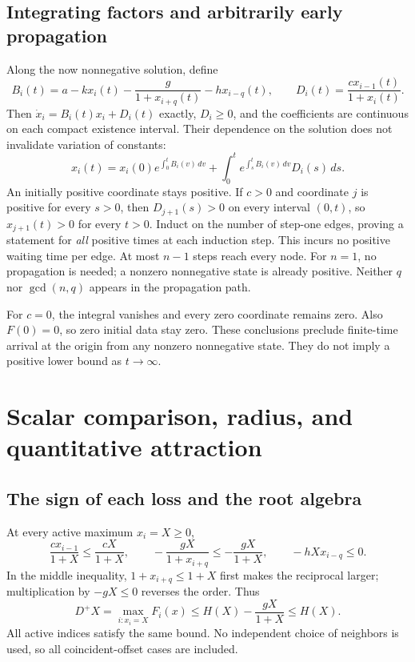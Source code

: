 \documentclass[11pt]{article}
\begin{document}
\subsection{Integrating factors and arbitrarily early propagation}
Along the now nonnegative solution, define
\[
 B_i(t)=a-kx_i(t)-\frac{g}{1+x_{i+q}(t)}-h x_{i-q}(t),\qquad
 D_i(t)=\frac{c x_{i-1}(t)}{1+x_i(t)}.
\]
Then $\dot x_i=B_i(t)x_i+D_i(t)$ exactly, $D_i\geq0$, and the coefficients
are continuous on each compact existence interval. Their dependence on
the solution does not invalidate variation of constants:
\begin{equation}\label{A01:positive}
 x_i(t)=x_i(0)e^{\int_0^t B_i(v)\,dv}
       +\int_0^t e^{\int_s^t B_i(v)\,dv}D_i(s)\,ds.
\end{equation}
An initially positive coordinate stays positive. If $c>0$ and coordinate
$j$ is positive for every $s>0$, then $D_{j+1}(s)>0$ on every interval
$(0,t)$, so $x_{j+1}(t)>0$ for every $t>0$. Induct on the number of
step-one edges, proving a statement for \emph{all} positive times at
each induction step. This incurs no positive waiting time per edge.
At most $n-1$ steps reach every node. For $n=1$, no propagation is
needed; a nonzero nonnegative state is already positive. Neither $q$
nor $\gcd(n,q)$ appears in the propagation path.

For $c=0$, the integral vanishes and every zero coordinate remains zero.
Also $F(0)=0$, so zero initial data stay zero. These conclusions preclude
finite-time arrival at the origin from any nonzero nonnegative state.
They do not imply a positive lower bound as $t\to\infty$.

\section{Scalar comparison, radius, and quantitative attraction}
\subsection{The sign of each loss and the root algebra}
At every active maximum $x_i=X\geq0$,
\[
 \frac{c x_{i-1}}{1+X}\leq\frac{cX}{1+X},\qquad
 -\frac{gX}{1+x_{i+q}}\leq-\frac{gX}{1+X},\qquad
 -hXx_{i-q}\leq0.
\]
In the middle inequality, $1+x_{i+q}\leq1+X$ first makes the reciprocal
larger; multiplication by $-gX\leq0$ reverses the order. Thus
\begin{equation}\label{A01:dini}
 D^+X=\max_{i:x_i=X}F_i(x)
       \leq H(X)-\frac{gX}{1+X}\leq H(X).
\end{equation}
All active indices satisfy the same bound. No independent choice of
neighbors is used, so all coincident-offset cases are included.
\end{document}

